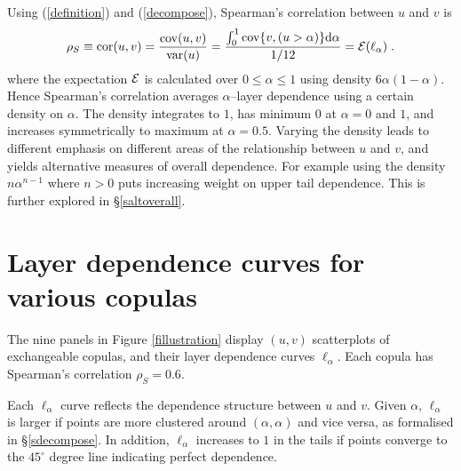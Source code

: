 \documentclass[authoryear]{elsarticle}
\newcommand{\var}{{\rm var}}
\newcommand{\cov}{{\rm cov}}
\newcommand{\E}{{\mathrm E}}
\newcommand{\Ex}{{\cal E}}
\newcommand{\cor}{\mathrm{cor}}
\newcommand{\de}{\mathrm{d}}
\newcommand{\cq}{\ ,\quad }
\newcommand{\eref}[1]{(\ref{#1})}
\newcommand{\fref}[1]{Figure \ref{#1}}
\newcommand{\sref}[1]{\S\ref{#1}}
\begin{document}
Using  \eref{definition} and \eref{decompose}, Spearman's correlation between $u$ and $v$ is
\begin{equation}\label{wtdaverage}
\rho_S\equiv \cor(u,v) =\frac{\cov(u,v)}{\var(u)}=\frac{\int _0^1\cov\{v,(u>\alpha)\}\de\alpha}{1/12}
=\Ex(\ell_\alpha)\; .
\end{equation}
where the expectation $\Ex$ is calculated over $0\le\alpha\le 1$ using density $6\alpha(1-\alpha)$. Hence Spearman's correlation averages $\alpha$--layer dependence using a certain density on $\alpha$. The density integrates to $1$, has minimum $0$ at $\alpha=0$ and $1$, and increases symmetrically to maximum at $\alpha=0.5$. Varying the density leads to different emphasis on different areas of the relationship between $u$ and $v$, and yields alternative measures of overall dependence. For example using the density $n\alpha^{n-1}$ where $n>0$ puts increasing weight on upper tail dependence. This is further explored in \sref{saltoverall}.

\section{Layer dependence curves for various copulas}\label{sldcurve}

The nine panels in \fref{fillustration} display $(u,v)$ scatterplots of exchangeable copulas, and their layer dependence curves $\ell_\alpha$. Each copula has Spearman's correlation $\rho_S=0.6$.

Each $\ell_\alpha$ curve reflects the dependence structure between $u$ and $v$. Given $\alpha$, $\ell_\alpha$ is larger if points are more clustered around $(\alpha,\alpha)$ and vice versa, as formalised in  \sref{sdecompose}. In addition, $\ell_\alpha$ increases to $1$ in the tails if points converge to the $45^\circ$ degree line indicating perfect dependence.
\end{document}
